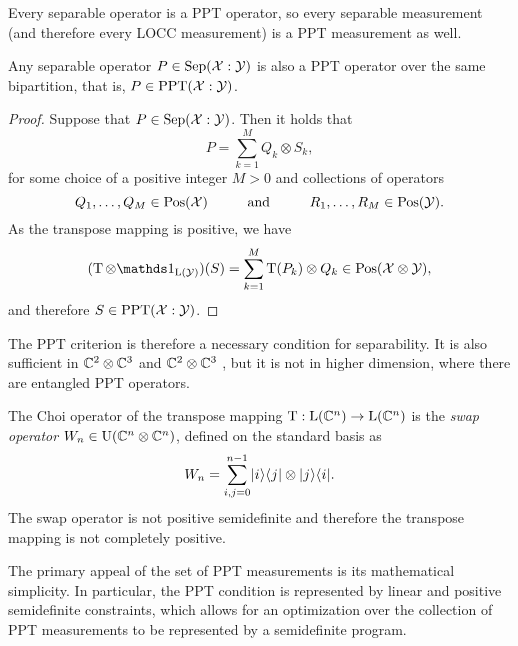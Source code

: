 Every separable operator is a PPT operator, so every separable measurement
(and therefore every LOCC measurement) is a PPT measurement as well. 

\begin{theorem}
Any separable operator $P \in \mathrm{Sep}(\mathcal{X}:\mathcal{Y})$ is also a PPT operator over the same
bipartition, that is, $P \in \mathrm{PPT}(\mathcal{X}:\mathcal{Y})$.
\end{theorem}
\begin{proof}
Suppose that $P \in \mathrm{Sep}(\mathcal{X}:\mathcal{Y})$. Then it holds that
\begin{equation}
  P = \sum_{k = 1}^{M} Q_k \otimes S_k,
\end{equation}
for some choice of a positive integer $M > 0$ and collections of operators 
\begin{equation}
  Q_1,\ldots,Q_M \in \mathrm{Pos}(\mathcal{X})
  \hspace*{1cm}\mbox{and}\hspace*{1cm}
  R_1,\ldots,R_M\in\mathrm{Pos}(\mathcal{Y}).
\end{equation}
As the transpose mapping is positive, we have
\begin{equation}
  (\pt \otimes \I_{\Lin(\Y)})(S) = \sum_{k=1}^{M}\pt(P_{k})\otimes Q_{k} 
    \in \Pos(\X\otimes\Y),
\end{equation}
and therefore $S \in \mathrm{PPT}(\mathcal{X}:\mathcal{Y})$.
\end{proof}

The PPT criterion is therefore a necessary condition for separability. It is 
also sufficient in $\mathbb{C}^{2}\otimes\mathbb{C}^{3}$ and $\mathbb{C}^{2}\otimes\mathbb{C}^{3}$ 
\cite{Peres1996,Horodecki1996}, but it is not in higher dimension, 
where there are entangled PPT operators. 

The Choi operator of the transpose mapping $\operatorname{T} : \mathrm{L}(\mathbb{C}^{n})\to\mathrm{L}(\mathbb{C}^{n})$
is the \emph{swap operator} 
$W_{n} \in \mathrm{U}(\mathbb{C}^{n}\otimes\mathbb{C}^{n})$, defined on the standard basis as
\begin{equation}
\label{eq:swap-operator}
  W_{n} = \sum_{i,j=0}^{n-1}\lvert\mspace{0.5mu} i \mspace{0.5mu} \rangle\langle\mspace{0.5mu} j \mspace{0.5mu} \rvert\otimes\lvert\mspace{0.5mu} j \mspace{0.5mu} \rangle\langle\mspace{0.5mu} i \mspace{0.5mu} \rvert.
\end{equation}
The swap operator is not positive semidefinite and therefore the transpose
mapping is not completely positive.

The primary appeal of the set of PPT measurements is its mathematical simplicity.
In particular, the PPT condition is represented by linear and positive
semidefinite constraints, which allows for an optimization over the collection
of PPT measurements to be represented by a semidefinite program.

